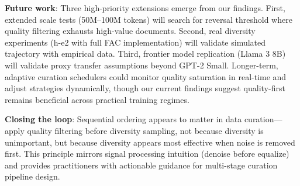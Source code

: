 \textbf{Future work}: Three high-priority extensions emerge from our findings. First, extended scale tests (50M--100M tokens) will search for reversal threshold where quality filtering exhausts high-value documents. Second, real diversity experiments (h-e2 with full FAC implementation) will validate simulated trajectory with empirical data. Third, frontier model replication (Llama 3 8B) will validate proxy transfer assumptions beyond GPT-2 Small. Longer-term, adaptive curation schedulers could monitor quality saturation in real-time and adjust strategies dynamically, though our current findings suggest quality-first remains beneficial across practical training regimes.

\textbf{Closing the loop}: Sequential ordering appears to matter in data curation---apply quality filtering before diversity sampling, not because diversity is unimportant, but because diversity appears most effective when noise is removed first. This principle mirrors signal processing intuition (denoise before equalize) and provides practitioners with actionable guidance for multi-stage curation pipeline design.
